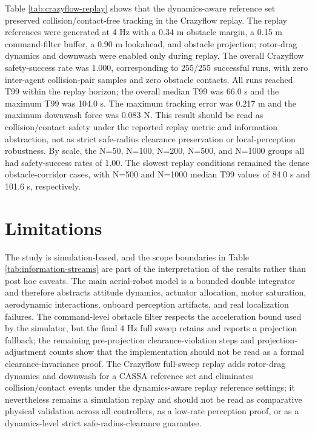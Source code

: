 \documentclass[11pt]{article}
\begin{document}
Table \ref{tab:crazyflow-replay} shows that the dynamics-aware reference set preserved collision/contact-free tracking in the Crazyflow replay. The replay references were generated at 4 Hz with a 0.34 m obstacle margin, a 0.15 m command-filter buffer, a 0.90 m lookahead, and obstacle projection; rotor-drag dynamics and downwash were enabled only during replay. The overall Crazyflow safety-success rate was 1.000, corresponding to 255/255 successful runs, with zero inter-agent collision-pair samples and zero obstacle contacts. All runs reached T99 within the replay horizon; the overall median T99 was 66.0 s and the maximum T99 was 104.0 s. The maximum tracking error was 0.217 m and the maximum downwash force was 0.083 N. This result should be read as collision/contact safety under the reported replay metric and information abstraction, not as strict safe-radius clearance preservation or local-perception robustness. By scale, the N=50, N=100, N=200, N=500, and N=1000 groups all had safety-success rates of 1.00. The slowest replay conditions remained the dense obstacle-corridor cases, with N=500 and N=1000 median T99 values of 84.0 s and 101.6 s, respectively.



\section{Limitations}

The study is simulation-based, and the scope boundaries in Table \ref{tab:information-streams} are part of the interpretation of the results rather than post hoc caveats. The main aerial-robot model is a bounded double integrator and therefore abstracts attitude dynamics, actuator allocation, motor saturation, aerodynamic interactions, onboard perception artifacts, and real localization failures. The command-level obstacle filter respects the acceleration bound used by the simulator, but the final 4 Hz full sweep retains and reports a projection fallback; the remaining pre-projection clearance-violation steps and projection-adjustment counts show that the implementation should not be read as a formal clearance-invariance proof. The Crazyflow full-sweep replay adds rotor-drag dynamics and downwash for a CASSA reference set and eliminates collision/contact events under the dynamics-aware replay reference settings; it nevertheless remains a simulation replay and should not be read as comparative physical validation across all controllers, as a low-rate perception proof, or as a dynamics-level strict safe-radius-clearance guarantee.
\end{document}
